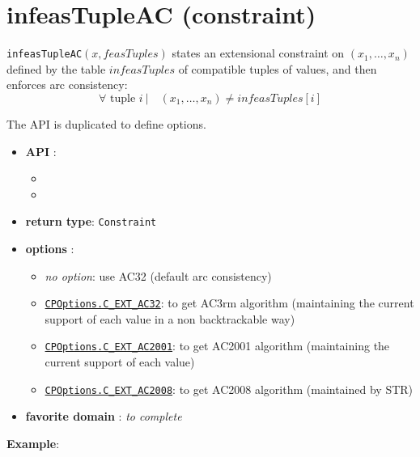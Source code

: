 \label{infeastupleac}
\hypertarget{infeastupleac}{}

\section{infeasTupleAC (constraint)}\label{infeastupleac:infeastupleacconstraint}\hypertarget{infeastupleac:infeastupleacconstraint}{}
\begin{notedef}
  \texttt{infeasTupleAC}$(x,feasTuples)$ states an extensional constraint on $(x_1,\ldots,x_n)$ defined by the table $infeasTuples$ of compatible tuples of values, and then enforces arc consistency:
      $$\forall \text{ tuple } i\ |\quad (x_1,\ldots,x_n)\neq infeasTuples[i]$$
\end{notedef}

The API is duplicated to define options.
\begin{itemize}
	\item \textbf{API} :
	\begin{itemize}
		\item {}
		\item {}
	\end{itemize}
	\item \textbf{return type}: \texttt{Constraint}
	\item \textbf{options} :
	\begin{itemize}
		\item \emph{no option}: use AC32 (default arc consistency)
		\item \hyperlink{cext32:cext32options}{\tt CPOptions.C\_EXT\_AC32}: to get AC3rm algorithm (maintaining the current support of each value in a non backtrackable way)
		\item \hyperlink{cext32:cext2001options}{\tt CPOptions.C\_EXT\_AC2001}: to get AC2001 algorithm (maintaining the current support of each value)
		\item \hyperlink{cext32:cext2008options}{\tt CPOptions.C\_EXT\_AC2008}: to get AC2008 algorithm (maintained by STR)
	\end{itemize}
	\item \textbf{favorite domain} : \emph{to complete}
\end{itemize}

\textbf{Example}:

